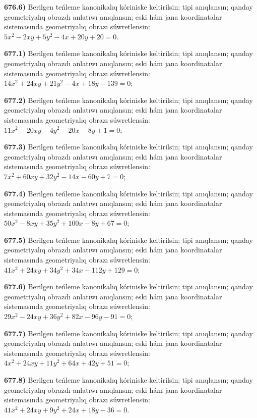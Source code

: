 \textbf{676.6)} Berilgen teńleme kanonikalıq kóriniske keltirilsin; tipi anıqlansın; qanday geometriyalıq obrazdı anlatıwı anıqlansın; eski hám jana koordinatalar sistemasında geometriyalıq obrazı súwretlensin: $5 x^2-2 x y+5 y^2-4 x+20 y+20=0$.

\textbf{677.1)} Berilgen teńleme kanonikalıq kóriniske keltirilsin; tipi anıqlansın; qanday geometriyalıq obrazdı anlatıwı anıqlansın; eski hám jana koordinatalar sistemasında geometriyalıq obrazı súwretlensin: $14 x^2+24 x y+21 y^2-4 x+18 y-139=0$;

\textbf{677.2)} Berilgen teńleme kanonikalıq kóriniske keltirilsin; tipi anıqlansın; qanday geometriyalıq obrazdı anlatıwı anıqlansın; eski hám jana koordinatalar sistemasında geometriyalıq obrazı súwretlensin: $11 x^2-20 x y-4 y^2-20 x-8 y+1=0$;

\textbf{677.3)} Berilgen teńleme kanonikalıq kóriniske keltirilsin; tipi anıqlansın; qanday geometriyalıq obrazdı anlatıwı anıqlansın; eski hám jana koordinatalar sistemasında geometriyalıq obrazı súwretlensin: $7 x^2+60 x y+32 y^2-14 x-60 y+7=0$;

\textbf{677.4)} Berilgen teńleme kanonikalıq kóriniske keltirilsin; tipi anıqlansın; qanday geometriyalıq obrazdı anlatıwı anıqlansın; eski hám jana koordinatalar sistemasında geometriyalıq obrazı súwretlensin: $50 x^2-8 x y+35 y^2+100 x-8 y+67=0$;

\textbf{677.5)} Berilgen teńleme kanonikalıq kóriniske keltirilsin; tipi anıqlansın; qanday geometriyalıq obrazdı anlatıwı anıqlansın; eski hám jana koordinatalar sistemasında geometriyalıq obrazı súwretlensin: $41 x^2+24 x y+34 y^2+34 x-112 y+129=0$;

\textbf{677.6)} Berilgen teńleme kanonikalıq kóriniske keltirilsin; tipi anıqlansın; qanday geometriyalıq obrazdı anlatıwı anıqlansın; eski hám jana koordinatalar sistemasında geometriyalıq obrazı súwretlensin: $29 x^2-24 x y+36 y^2+82 x-96 y-91=0$;

\textbf{677.7)} Berilgen teńleme kanonikalıq kóriniske keltirilsin; tipi anıqlansın; qanday geometriyalıq obrazdı anlatıwı anıqlansın; eski hám jana koordinatalar sistemasında geometriyalıq obrazı súwretlensin: $4 x^2+24 x y+11 y^2+64 x+42 y+51=0$;

\textbf{677.8)} Berilgen teńleme kanonikalıq kóriniske keltirilsin; tipi anıqlansın; qanday geometriyalıq obrazdı anlatıwı anıqlansın; eski hám jana koordinatalar sistemasında geometriyalıq obrazı súwretlensin: $41 x^2+24 x y+9 y^2+24 x+18 y-36=0$.

